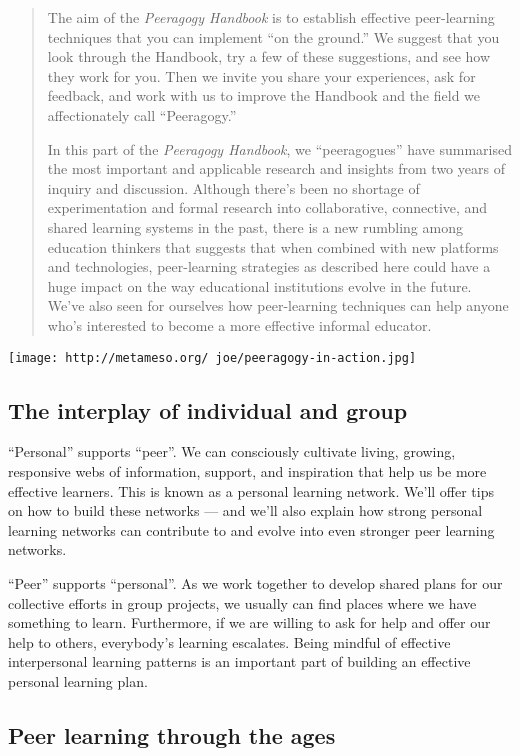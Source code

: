 \begin{quote}
The aim of the \emph{Peeragogy Handbook} is to establish effective
peer-learning techniques that you can implement ``on the ground.'' We
suggest that you look through the Handbook, try a few of these
suggestions, and see how they work for you. Then we invite you share
your experiences, ask for feedback, and work with us to improve the
Handbook and the field we affectionately call ``Peeragogy.''

In this part of the \emph{Peeragogy Handbook}, we ``peeragogues'' have
summarised the most important and applicable research and insights from
two years of inquiry and discussion. Although there's been no shortage
of experimentation and formal research into collaborative, connective,
and shared learning systems in the past, there is a new rumbling among
education thinkers that suggests that when combined with new platforms
and technologies, peer-learning strategies as described here could have
a huge impact on the way educational institutions evolve in the future.
We've also seen for ourselves how peer-learning techniques can help
anyone who's interested to become a more effective informal educator.
\end{quote}

\texttt{[image: http://metameso.org/~joe/peeragogy-in-action.jpg]}

\subsection{The interplay of individual and group}

``Personal'' supports ``peer''. We can consciously cultivate living,
growing, responsive webs of information, support, and inspiration that
help us be more effective learners. This is known as a personal learning
network. We'll offer tips on how to build these networks --- and we'll
also explain how strong personal learning networks can contribute to and
evolve into even stronger peer learning networks.

``Peer'' supports ``personal''. As we work together to develop shared
plans for our collective efforts in group projects, we usually can find
places where we have something to learn. Furthermore, if we are willing
to ask for help and offer our help to others, everybody's learning
escalates. Being mindful of effective interpersonal learning patterns is
an important part of building an effective personal learning plan.

\subsection{Peer learning through the ages}

